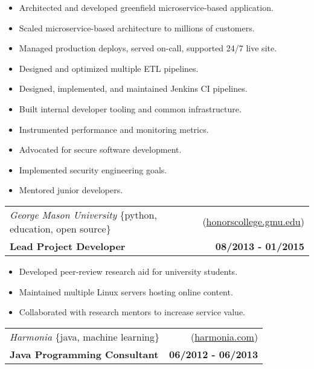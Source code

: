 \documentclass[10pt,letterpaper]{article}
\newenvironment{details}
{\begin{itemize}}
{\end{itemize}}
\begin{document}
\begin{details}
\item Architected and developed greenfield microservice-based application.
\item Scaled microservice-based architecture to millions of customers.
\item Managed production deploys, served on-call, supported 24/7 live site.
\item Designed and optimized multiple ETL pipelines.
\item Designed, implemented, and maintained Jenkins CI pipelines.
\item Built internal developer tooling and common infrastructure.
\item Instrumented performance and monitoring metrics.
\item Advocated for secure software development.
\item Implemented security engineering goals.
\item Mentored junior developers.
\end{details}

\vspace{0.25cm}

\noindent\begin{tabularx}{\textwidth}{@{}X r@{}}
  \textit{George Mason University} \{python, education, open source\} & (\href{https://honorscollege.gmu.edu}{honorscollege.gmu.edu}) \\
  \textbf{Lead Project Developer} & \textbf{08/2013 - 01/2015}
\end{tabularx}

\begin{details}
\item Developed peer-review research aid for university students.
\item Maintained multiple Linux servers hosting online content.
\item Collaborated with research mentors to increase service value.
\end{details}

\vspace{0.25cm}

\noindent\begin{tabularx}{\textwidth}{@{}X r@{}}
  \textit{Harmonia} \{java, machine learning\} & (\href{https://harmonia.com}{harmonia.com}) \\
  \textbf{Java Programming Consultant} & \textbf{06/2012 - 06/2013}
\end{tabularx}
\end{document}
